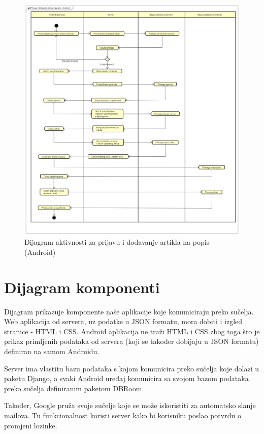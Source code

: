 			\begin{figure}[H]
				\centering
				\includegraphics[width=1.0\linewidth]{dijagrami/dodavanje-art.png}
				\caption{Dijagram aktivnosti za prijavu i dodavanje artikla na popis (Android)}
				\label{fig:act-dodavanje-art}
			\end{figure}
		
		\section{Dijagram komponenti}
		
			Dijagram prikazuje komponente naše aplikacije koje komuniciraju preko sučelja. Web aplikacija od servera, uz podatke u JSON formatu, mora dobiti i izgled stranice - HTML i CSS. Android aplikacija ne traži HTML i CSS zbog toga što je prikaz primljenih podataka od servera (koji se također dobijaju u JSON formatu) definiran na samom Androidu.
			
			Server ima vlastitu bazu podataka s kojom komunicira preko sučelja koje dolazi u paketu Django, a svaki Android uređaj komunicira sa svojom bazom podataka preko sučelja definiranim paketom DBRoom.
			
			Također, Google pruža svoje sučelje koje se može iskoristiti za automatsko slanje mailova. Tu funkcionalnost koristi server kako bi korisniku poslao potvrdu o promjeni lozinke.
		

